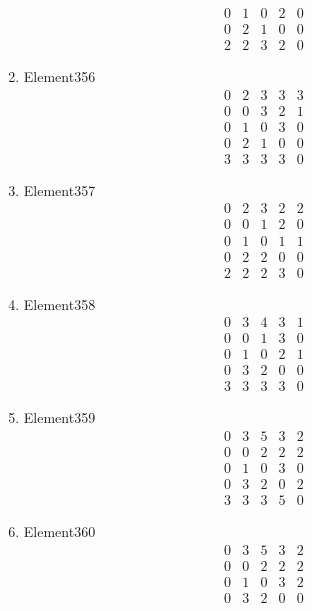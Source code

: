 \documentclass[12pt]{article}
\begin{document}
\begin{multicols}{3}
\begin{enumerate}
\begin{equation*}
\begin{array}{ccccc}
0&1&0&2&0\\
0&2&1&0&0\\
2&2&3&2&0
\end{array}
\end{equation*}
\item Element356
\begin{equation*}
\begin{array}{ccccc}
0&2&3&3&3\\
0&0&3&2&1\\
0&1&0&3&0\\
0&2&1&0&0\\
3&3&3&3&0
\end{array}
\end{equation*}
\item Element357
\begin{equation*}
\begin{array}{ccccc}
0&2&3&2&2\\
0&0&1&2&0\\
0&1&0&1&1\\
0&2&2&0&0\\
2&2&2&3&0
\end{array}
\end{equation*}
\item Element358
\begin{equation*}
\begin{array}{ccccc}
0&3&4&3&1\\
0&0&1&3&0\\
0&1&0&2&1\\
0&3&2&0&0\\
3&3&3&3&0
\end{array}
\end{equation*}
\item Element359
\begin{equation*}
\begin{array}{ccccc}
0&3&5&3&2\\
0&0&2&2&2\\
0&1&0&3&0\\
0&3&2&0&2\\
3&3&3&5&0
\end{array}
\end{equation*}
\item Element360
\begin{equation*}
\begin{array}{ccccc}
0&3&5&3&2\\
0&0&2&2&2\\
0&1&0&3&2\\
0&3&2&0&0\\

\end{array}
\end{equation*}
\end{enumerate}
\end{multicols}
\end{document}
